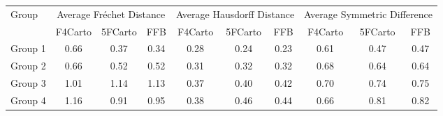 
\begin{tabular}{lccc|ccc|ccc}
\toprule
\multirow{2}{*}{Group} & \multicolumn{3}{c}{Average Fréchet Distance} & \multicolumn{3}{c}{Average Hausdorff Distance} & \multicolumn{3}{c}{Average Symmetric Difference} \\
\cmidrule(lr){2-10}
                   & F4Carto & 5FCarto & FFB & F4Carto & 5FCarto & FFB & F4Carto & 5FCarto & FFB \\
\midrule

Group 1 & 0.66 & 0.37 & 0.34 & 0.28 & 0.24 & 0.23 & 0.61 & 0.47 & 0.47 \\
Group 2 & 0.66 & 0.52 & 0.52 & 0.31 & 0.32 & 0.32 & 0.68 & 0.64 & 0.64 \\
Group 3 & 1.01 & 1.14 & 1.13 & 0.37 & 0.40 & 0.42 & 0.70 & 0.74 & 0.75 \\
Group 4 & 1.16 & 0.91 & 0.95 & 0.38 & 0.46 & 0.44 & 0.66 & 0.81 & 0.82 \\
\bottomrule
\end{tabular}
